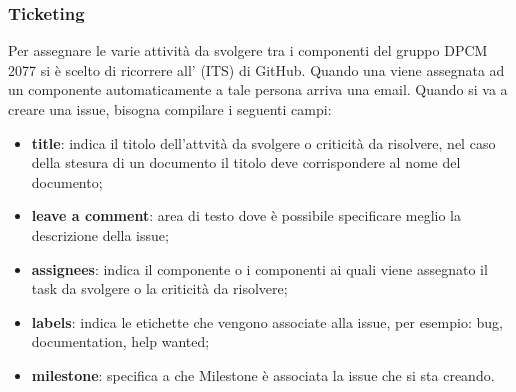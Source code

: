 \subsubsection{Ticketing}
Per assegnare le varie attività da svolgere tra i componenti del gruppo DPCM 2077 si è scelto di ricorrere all' (ITS) di GitHub.
Quando una  viene assegnata ad un componente automaticamente a tale persona arriva una email.
Quando si va a creare una issue, bisogna compilare i seguenti campi:
\begin{itemize}
\item{\textbf{title}: indica il titolo dell'attvità da svolgere o criticità da risolvere, nel caso della stesura di un documento il titolo deve corrispondere al nome del documento;}
\item{\textbf{leave a comment}: area di testo dove è possibile specificare meglio la descrizione della issue;}
\item{\textbf{assignees}: indica il componente o i componenti ai quali viene assegnato il task da svolgere o la criticità da risolvere;}
\item{\textbf{labels}: indica le etichette che vengono associate alla issue, per esempio: bug, documentation, help wanted;}
\item{\textbf{milestone}: specifica a che Milestone è associata la issue che si sta creando.}
\end{itemize} 

